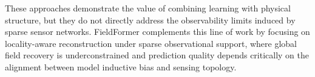 These approaches demonstrate the value of combining learning with physical structure, but they do not directly address the observability limits induced by sparse sensor networks. FieldFormer complements this line of work by focusing on locality-aware reconstruction under sparse observational support, where global field recovery is underconstrained and prediction quality depends critically on the alignment between model inductive bias and sensing topology.
